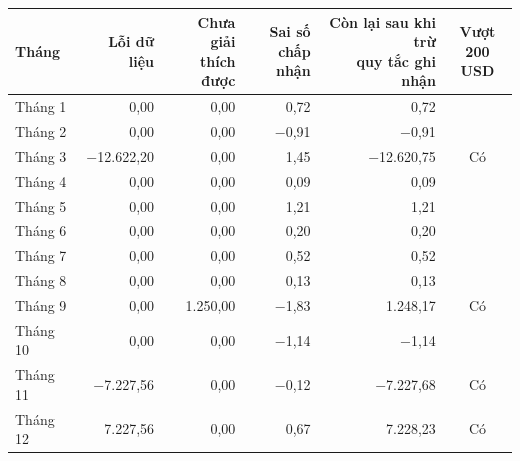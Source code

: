 \begin{tabular}{@{}l r r r r c@{}}
\toprule
Tháng & Lỗi dữ liệu & \makecell[r]{Chưa giải\\thích được} & \makecell[r]{Sai số\\chấp nhận} & \makecell[r]{Còn lại sau khi trừ\\quy tắc ghi nhận} & \makecell[c]{Vượt\\200 USD} \\
\midrule
Tháng 1 & 0,00 & 0,00 & 0,72 & 0,72 &  \\
Tháng 2 & 0,00 & 0,00 & $-$0,91 & $-$0,91 &  \\
Tháng 3 & $-$12.622,20 & 0,00 & 1,45 & $-$12.620,75 & Có \\
Tháng 4 & 0,00 & 0,00 & 0,09 & 0,09 &  \\
Tháng 5 & 0,00 & 0,00 & 1,21 & 1,21 &  \\
Tháng 6 & 0,00 & 0,00 & 0,20 & 0,20 &  \\
Tháng 7 & 0,00 & 0,00 & 0,52 & 0,52 &  \\
Tháng 8 & 0,00 & 0,00 & 0,13 & 0,13 &  \\
Tháng 9 & 0,00 & 1.250,00 & $-$1,83 & 1.248,17 & Có \\
Tháng 10 & 0,00 & 0,00 & $-$1,14 & $-$1,14 &  \\
Tháng 11 & $-$7.227,56 & 0,00 & $-$0,12 & $-$7.227,68 & Có \\
Tháng 12 & 7.227,56 & 0,00 & 0,67 & 7.228,23 & Có \\
\bottomrule
\end{tabular}

